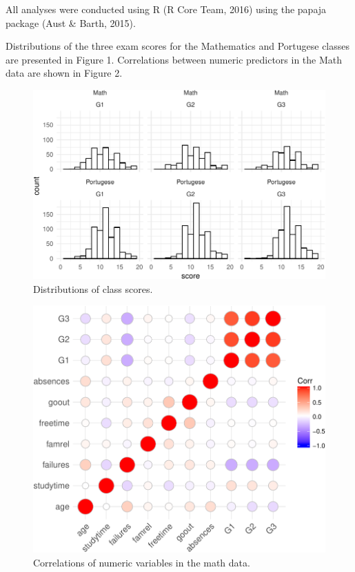 \documentclass[english,floatsintext,man]{apa6}
\theoremstyle{definition}
\theoremstyle{definition}
\theoremstyle{definition}
\theoremstyle{remark}
\begin{document}
All analyses were conducted using R (R Core Team, 2016) using the papaja
package (Aust \& Barth, 2015).

Distributions of the three exam scores for the Mathematics and Portugese
classes are presented in Figure 1. Correlations between numeric
predictors in the Math data are shown in Figure 2.

\begin{figure}

{\centering \includegraphics[width=1\linewidth]{studentAPA_comp_files/figure-latex/fig1-1} 

}

\caption{Distributions of class scores.}\label{fig:fig1}
\end{figure}

\begin{figure}

{\centering \includegraphics[width=0.7\linewidth]{studentAPA_comp_files/figure-latex/fig2-1} 

}

\caption{Correlations of numeric variables in the math data.}\label{fig:fig2}
\end{figure}
\end{document}
